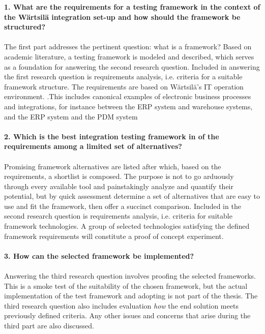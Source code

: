 \documentclass[12pt,a4paper,oneside,pdftex]{report}
\begin{document}
\begin{adjustwidth}{2.5em}{0pt}
\textbf{1. What are the requirements for a testing framework in the context of the W{\"a}rtsil{\"a} integration set-up and how should the framework be structured?} \\
\\
The first part addresses the pertinent question: what is a framework? Based on academic literature, a testing framework is modeled and described, which serves as a foundation for answering the second research question. Included in answering the first research question is requirements analysis, i.e. criteria for a suitable framework structure. The requirements are based on W{\"a}rtsil{\"a}'s IT operation environment. .This includes canonical examples of electronic business processes and integrations, for instance between the ERP system and warehouse systems, and the ERP system and the PDM system \\
\\
\textbf{2. Which is the best integration testing framework in of the requirements among a limited set of alternatives?} \\
\\
Promising framework alternatives are listed after which, based on the requirements, a shortlist is composed. The purpose is not to go arduously through every available tool and painstakingly analyze and quantify their potential, but by quick assessment determine a set of alternatives that are easy to use and fit the framework, then offer a succinct comparison. Included in the second research question is requirements analysis, i.e. criteria for suitable framework technologies. A group of selected technologies satisfying the defined framework requirements will constitute a proof of concept experiment. \\
\\
\textbf{3. How can the selected framework be implemented?} \\
\\
Answering the third research question involves proofing the selected frameworks. This is a smoke test of the suitability of the chosen framework, but the actual implementation of the test framework and adopting is not part of the thesis. The third research question also includes evaluation \emph{how} the end solution meets previously defined criteria. Any other issues and concerns that arise during the third part are also discussed. \\
\end{adjustwidth}
\end{document}
